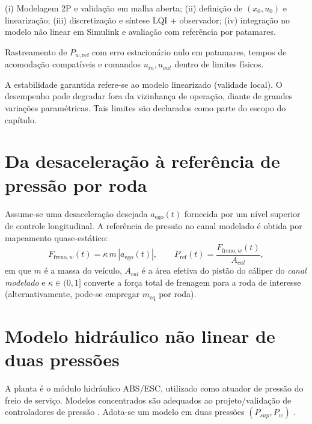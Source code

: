 (i) Modelagem 2P e validação em malha aberta; (ii) definição de $(x_0,u_0)$ e linearização; (iii) discretização e síntese LQI + observador; (iv) integração no modelo não linear em Simulink e avaliação com referência por patamares.

Rastreamento de $P_{w,\mathrm{ref}}$ com erro estacionário nulo em patamares, tempos de acomodação compatíveis e comandos $u_{in},u_{out}$ dentro de limites físicos.

A estabilidade garantida refere-se ao modelo linearizado (validade local). O desempenho pode degradar fora da vizinhança de operação, diante de grandes variações paramétricas. Tais limites são declarados como parte do escopo do capítulo.

\section{Da desaceleração à referência de pressão por roda}
\label{sec:mapeamento-aref-pressao}

Assume-se uma desaceleração desejada $a_{\mathrm{ego}}(t)$ fornecida por um nível superior de controle longitudinal. A referência de pressão no canal modelado é obtida por mapeamento quase-estático:
\begin{equation}
    F_{\mathrm{freno},w}(t) = \kappa\, m\,|a_{\mathrm{ego}}(t)|,
    \qquad
    P_{\mathrm{ref}}(t) = \frac{F_{\mathrm{freno},w}(t)}{A_{cal}},
    \label{eq:mapeamento_aref_pressao}
\end{equation}
em que $m$ é a massa do veículo, $A_{cal}$ é a área efetiva do pistão do cáliper do \emph{canal modelado} e $\kappa\in(0,1]$ converte a força total de frenagem para a roda de interesse (alternativamente, pode-se empregar $m_{\mathrm{eq}}$ por roda).

\section{Modelo hidráulico não linear de duas pressões}
\label{sec:modelo2p}

A planta é o módulo hidráulico ABS/ESC, utilizado como atuador de pressão do freio de serviço. Modelos concentrados são adequados ao projeto/validação de controladores de pressão \cite{HouhuaJing2022,PressureCoordinatedControl2023,ZengYangHuang2023,MotorParametricDesign2023}. Adota-se um modelo em duas pressões $(P_{sup},P_w)$ \cite{HouhuaJing2022,ZengYangHuang2023,Lv2014}.

